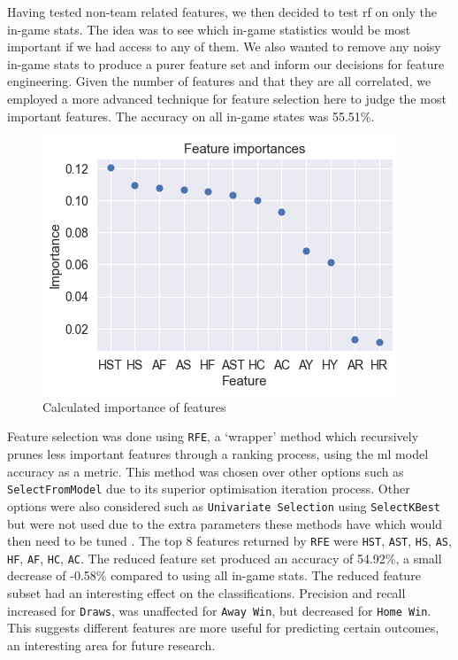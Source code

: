 \documentclass{article}
\newcommand{\sw}[1]{\texttt{#1}}
\begin{document}
Having tested non-team related features, we then decided to test \gls{rf} on only the in-game stats. The idea was to see which in-game statistics would be most important if we had access to any of them. We also wanted to remove any noisy in-game stats to produce a purer feature set and inform our decisions for feature engineering. Given the number of features and that they are all correlated, we employed a more advanced technique for feature selection here to judge the most important features. The accuracy on all in-game states was 55.51\%.
\vspace{-0.8em}
\begin{figure}[!htb]
    \centering
    \includegraphics[width=0.5\linewidth]{Images/Figure 2.png}
    \caption{Calculated importance of features }
    \label{fig:featureimportance}
\end{figure}
\vspace{-0.8em}

Feature selection was done using \sw{RFE}, a ‘wrapper’ method which recursively prunes less important features through a ranking process, using the \gls{ml} model accuracy as a metric. This method was chosen over other options such as \sw{SelectFromModel} due to its superior optimisation iteration process. Other options were also considered such as \sw{Univariate Selection} using \sw{SelectKBest} but were not used due to the extra parameters these methods have which would then need to be tuned \cite{ippolitomediumfeatureselection}. The top 8 features returned by \sw{RFE} were \sw{HST}, \sw{AST}, \sw{HS}, \sw{AS}, \sw{HF}, \sw{AF}, \sw{HC}, \sw{AC}. The reduced feature set produced an accuracy of 54.92\%, a small decrease of -0.58\% compared to using all in-game stats. The reduced feature subset had an interesting effect on the classifications. Precision and recall increased for \sw{Draws}, was unaffected for \sw{Away Win}, but decreased for \sw{Home Win}. This suggests different features are more useful for predicting certain outcomes, an interesting area for future research.
\end{document}
